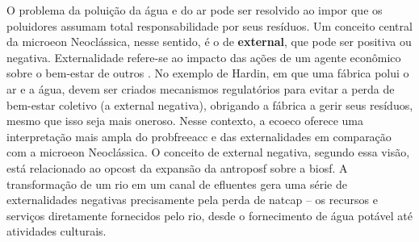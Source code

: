 \documentclass[./main.tex]{subfiles}
\begin{document}
\noindent O problema da poluição da água e do ar pode ser resolvido ao impor que os poluidores assumam total responsabilidade por seus resíduos. Um conceito central da \gls{microeon} Neoclássica, nesse sentido, é o de \textbf{\gls{external}}, que pode ser positiva ou negativa. Externalidade refere-se ao impacto das ações de um agente econômico sobre o bem-estar de outros \cite{Mankiw2002a}. No exemplo de Hardin, em que uma fábrica polui o ar e a água, devem ser criados mecanismos regulatórios para evitar a perda de bem-estar coletivo (a \gls{external} negativa), obrigando a fábrica a gerir seus resíduos, mesmo que isso seja mais oneroso. Nesse contexto, a \gls{ecoeco} oferece uma interpretação mais ampla do \gls{probfreeacc} e das externalidades em comparação com a \gls{microeon} Neoclássica. O conceito de \gls{external} negativa, segundo essa visão, está relacionado ao \gls{opcost} da expansão da \gls{antroposf} sobre a \gls{biosf}. A transformação de um rio em um canal de efluentes gera uma série de externalidades negativas precisamente pela perda de \gls{natcap} -- os recursos e serviços diretamente fornecidos pelo rio, desde o fornecimento de água potável até atividades culturais. 
\end{document}
